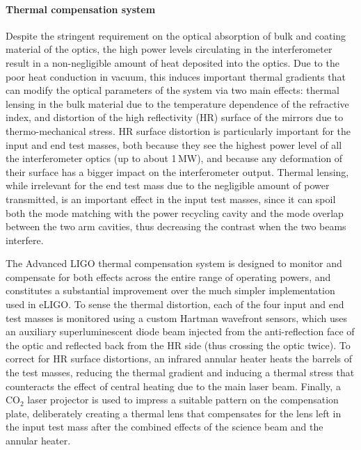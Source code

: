 \paragraph*{Thermal compensation system}
Despite the stringent requirement on the optical absorption of bulk and coating 
material of the optics, the high power levels circulating in the interferometer result 
in a non-negligible amount of heat deposited into the optics.
Due to the poor heat conduction in vacuum, this induces important thermal gradients that can modify 
the optical parameters of the system via two main effects: thermal lensing in the 
bulk material due to the temperature dependence of the refractive index,
and distortion of the high reflectivity (HR) surface of the mirrors due to thermo-mechanical stress.
HR surface distortion is particularly important for the input and end test masses, both because they see the highest power level of all the interferometer optics (up to about 1\,MW), and because any deformation of their surface has a bigger impact on the interferometer output.
Thermal lensing, while irrelevant for the end test mass due to the negligible amount of power transmitted, is an important effect in the input test masses, since it can spoil both the mode matching with the power recycling cavity and the mode overlap between the two arm cavities, thus decreasing the contrast when the two beams interfere.

The Advanced LIGO thermal compensation system is designed to monitor and compensate for both effects across the entire range of operating powers, and constitutes a substantial improvement over the much simpler implementation used in eLIGO.
To sense the thermal distortion, each of the four input and end test masses is monitored using a custom Hartman wavefront sensors, which uses an auxiliary superluminescent diode beam injected from the anti-reflection face of the optic and reflected back from the HR side (thus crossing the optic twice).
To correct for HR surface distortions, an infrared annular heater heats the barrels of the test masses, reducing the thermal gradient and inducing a thermal stress that counteracts the effect of central heating due to the main laser beam.
Finally, a CO$_2$ laser projector is used to impress a suitable pattern on the compensation plate, deliberately creating a thermal lens that compensates for the lens left in the input test mass after the combined effects of the science beam and the annular heater\cite{TCS_inpreparation}.

